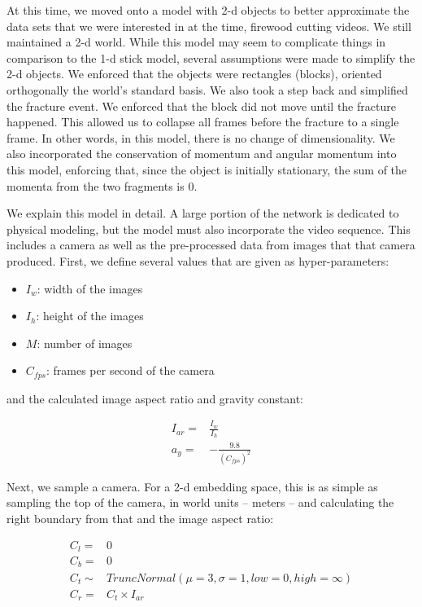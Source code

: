 \documentclass[runningheads]{llncs}
\begin{document}
At this time, we moved onto a model with 2-d objects to better approximate the 
data sets that we were interested in at the time, firewood cutting videos. We 
still maintained a 2-d world. While this model may seem to 
complicate things in comparison to the 1-d stick model, several assumptions were made to 
simplify the 2-d objects. We enforced  
that the objects were rectangles (blocks), oriented orthogonally the world's standard 
basis. We also took a step back and simplified the fracture event. We  
enforced that the block did not move until the fracture happened. This 
allowed us to collapse all frames before the fracture to a single frame. In 
other words, in this model, there is no change of dimensionality. We also 
incorporated the conservation of momentum and angular momentum into this model, 
enforcing that, since the object is initially stationary, the sum of the momenta 
from the two fragments is 0.

We explain this model in detail. A large portion of the network is dedicated to physical modeling, but the model 
must also incorporate the video sequence. This includes a camera as well as the 
pre-processed data from images that that camera produced. First, we define 
several values that are given as hyper-parameters:

\begin{itemize}
    \item $I_w$: width of the images
    \item $I_h$: height of the images
    \item $M$: number of images
    \item $C_{fps}$: frames per second of the camera
\end{itemize}

and the calculated image aspect ratio and gravity constant:

\begin{align*}
    I_{ar} =&  \frac{I_w}{I_h} \\
       a_y =& -\frac{9.8}{(C_{fps})^2}
\end{align*}

Next, we sample a camera. For a 2-d embedding space, this is as simple as 
sampling the top of the camera, in world units -- meters -- and calculating the 
right boundary from that and the image aspect ratio:

\begin{align*}
     C_l =& 0 \\
     C_b =& 0 \\
    C_t \sim& TruncNormal(\mu=3,\sigma=1,low=0,high=\infty) \\
     C_r =& C_t \times I_{ar}
\end{align*}
\end{document}
